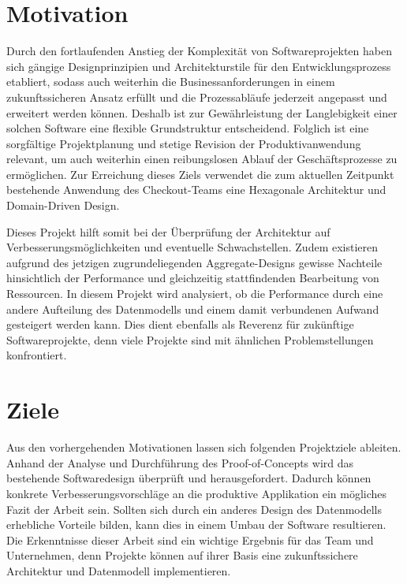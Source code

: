 \section{Motivation}

Durch den fortlaufenden Anstieg der Komplexität von Softwareprojekten \cite{Darcy.2010} haben sich gängige Designprinzipien und Architekturstile für den Entwicklungsprozess etabliert, sodass auch weiterhin die Businessanforderungen in einem zukunftssicheren Ansatz erfüllt und die Prozessabläufe jederzeit angepasst und erweitert werden können. Deshalb ist zur Gewährleistung der Langlebigkeit einer solchen Software eine flexible Grundstruktur entscheidend. Folglich ist eine sorgfältige Projektplanung und stetige Revision der Produktivanwendung relevant, um auch weiterhin einen reibungslosen Ablauf der Geschäftsprozesse zu ermöglichen. Zur Erreichung dieses Ziels verwendet die zum aktuellen Zeitpunkt bestehende Anwendung des Checkout-Teams eine Hexagonale Architektur und Domain-Driven Design.

Dieses Projekt hilft somit bei der Überprüfung der Architektur auf Verbesserungsmöglichkeiten und eventuelle Schwachstellen. Zudem existieren aufgrund des jetzigen zugrundeliegenden Aggregate-Designs gewisse Nachteile hinsichtlich der Performance und gleichzeitig stattfindenden Bearbeitung von Ressourcen. In diesem Projekt wird analysiert, ob die Performance durch eine andere Aufteilung des Datenmodells und einem damit verbundenen  Aufwand gesteigert werden kann. Dies dient ebenfalls als Reverenz für zukünftige Softwareprojekte, denn viele Projekte sind mit ähnlichen Problemstellungen konfrontiert.



\section{Ziele}

Aus den vorhergehenden Motivationen lassen sich folgenden Projektziele ableiten. Anhand der Analyse und Durchführung des Proof-of-Concepts wird das bestehende Softwaredesign überprüft und herausgefordert. Dadurch können konkrete Verbesserungsvorschläge an die produktive Applikation ein mögliches Fazit der Arbeit sein. Sollten sich durch ein anderes Design des Datenmodells erhebliche Vorteile bilden, kann dies in einem Umbau der Software resultieren. Die Erkenntnisse dieser Arbeit sind ein wichtige Ergebnis für das Team und Unternehmen, denn Projekte können auf ihrer Basis eine zukunftssichere Architektur und Datenmodell implementieren.
